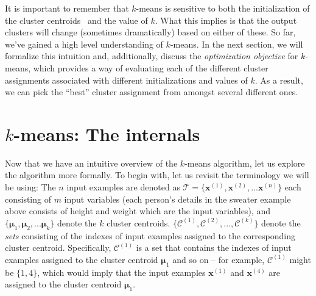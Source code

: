 It is important to remember that $k$-means is sensitive to both the initialization of the cluster centroids~\cite{CELEBI2013200} and the value of $k$. What this implies is that the output clusters will change (sometimes dramatically) based on either of these. So far, we've gained a high level understanding of $k$-means. In the next section, we will formalize this intuition and, additionally, discuss the \emph{optimization objective} for $k$-means, which provides a way of evaluating each of the different cluster assignments associated with different initializations and values of $k$. As a result, we can pick the ``best'' cluster assignment from amongst several different ones. 

\section{$k$-means: The internals}

Now that we have an intuitive overview of the $k$-means algorithm, let us explore the algorithm more formally. To begin with, let us revisit the terminology we will be using: The $n$ input examples are denoted as $\mathcal{T} = \{ \mathbf{x}^{(1)}, \mathbf{x}^{(2)}, ... \mathbf{x}^{(n)}\} $ each consisting of $m$ input variables (each person's details in the sweater example above consists of height and weight which are the input variables), and $\{ \boldsymbol{\mu}_1, \boldsymbol{\mu}_2, ... \boldsymbol{\mu}_k\}$ denote the $k$ cluster centroids.  $\{\mathcal{C}^{(1)}, \mathcal{C}^{(2)}, ..., \mathcal{C}^{(k)}\}$ denote the \emph{sets} consisting of the indexes of input examples assigned to the corresponding cluster centroid. Specifically, $\mathcal{C}^{(1)}$ is a set that contains the indexes of input examples assigned to the cluster centroid $\boldsymbol{\mu}_1$ and so on -- for example, $\mathcal{C}^{(1)}$ might be $\{ 1, 4\}$, which would imply that the input examples $\mathbf{x}^{(1)}$ and $\mathbf{x}^{(4)}$ are assigned to the cluster centroid $\boldsymbol{\mu}_1$. 

